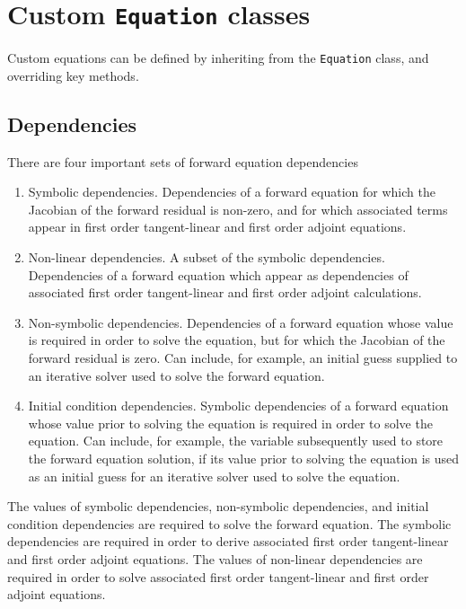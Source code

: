 \documentclass[11pt]{article}
\begin{document}
\section{Custom \texttt{Equation} classes}\label{sect:custom}

Custom equations can be defined by inheriting from the \texttt{Equation} class,
and overriding key methods.

\subsection{Dependencies}

There are four important sets of forward equation dependencies
\begin{enumerate}
  \item Symbolic dependencies. Dependencies of a forward equation for which the
    Jacobian of the forward residual is non-zero, and for which associated
    terms appear in first order tangent-linear and first order adjoint
    equations.
  \item Non-linear dependencies. A subset of the symbolic dependencies.
    Dependencies of a forward equation which appear as dependencies of
    associated first order tangent-linear and first order adjoint calculations.
  \item Non-symbolic dependencies. Dependencies of a forward equation whose
    value is required in order to solve the equation, but for which the
    Jacobian of the forward residual is zero. Can include, for example, an
    initial guess supplied to an iterative solver used to solve the forward
    equation.
  \item Initial condition dependencies. Symbolic dependencies of a forward
    equation whose value prior to solving the equation is required in order to
    solve the equation. Can include, for example, the variable subsequently
    used to store the forward equation solution, if its value prior to solving
    the equation is used as an initial guess for an iterative solver used to
    solve the equation.
\end{enumerate}
The values of symbolic dependencies, non-symbolic dependencies, and initial
condition dependencies are required to solve the forward equation. The symbolic
dependencies are required in order to derive associated first order
tangent-linear and first order adjoint equations. The values of non-linear
dependencies are required in order to solve associated first order
tangent-linear and first order adjoint equations.
\end{document}
